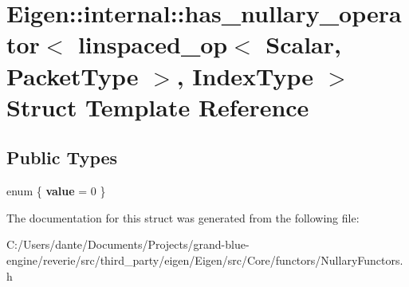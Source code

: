 \hypertarget{struct_eigen_1_1internal_1_1has__nullary__operator_3_01linspaced__op_3_01_scalar_00_01_packet_type_01_4_00_01_index_type_01_4}{}\section{Eigen\+::internal\+::has\+\_\+nullary\+\_\+operator$<$ linspaced\+\_\+op$<$ Scalar, Packet\+Type $>$, Index\+Type $>$ Struct Template Reference}
\label{struct_eigen_1_1internal_1_1has__nullary__operator_3_01linspaced__op_3_01_scalar_00_01_packet_type_01_4_00_01_index_type_01_4}
\subsection*{Public Types}
\begin{DoxyCompactItemize}
\item 
\mbox{\label{struct_eigen_1_1internal_1_1has__nullary__operator_3_01linspaced__op_3_01_scalar_00_01_packet_type_01_4_00_01_index_type_01_4_a3ec64b7dca149ebd264fbca9fefd3aad}} 
enum \{ {\bfseries value} = 0
 \}
\end{DoxyCompactItemize}


The documentation for this struct was generated from the following file\+:\begin{DoxyCompactItemize}
\item 
C\+:/\+Users/dante/\+Documents/\+Projects/grand-\/blue-\/engine/reverie/src/third\+\_\+party/eigen/\+Eigen/src/\+Core/functors/Nullary\+Functors.\+h\end{DoxyCompactItemize}
